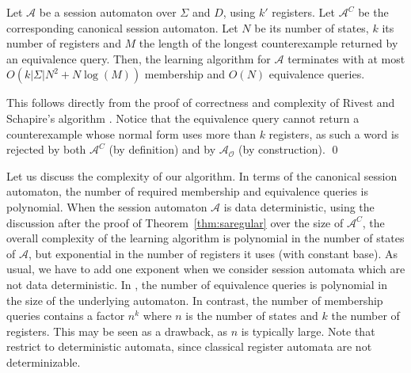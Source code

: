 \documentclass{LMCS}
\def\A{\mathcal A}
\newcommand{\can}[1]{#1^{C}}
\begin{document}
\begin{thm}
  Let $\A$ be a session automaton over $\Sigma$ and $D$, using $k'$
  registers. Let $\can{\A}$ be the corresponding canonical session
  automaton. Let $N$ be its number of states, $k$ its number of
  registers and $M$ the length of the longest counterexample returned
  by an equivalence query. Then, the learning algorithm for $\A$
  terminates with at most $O(k |\Sigma| N^2 + N \log (M))$ membership
  and $O(N)$ equivalence queries.
\end{thm}
\proof
  This follows directly from the proof of correctness and complexity
  of Rivest and Schapire's algorithm \cite{BergR05,RiSh:inference}.
  Notice that the equivalence query cannot return a counterexample
  whose normal form uses more than $k$ registers, as such a word is
  rejected by both $\can{\A}$ (by definition) and by $\A_{\mathcal O}$
  (by construction). \qed

Let us discuss the complexity of our algorithm. In terms of the
canonical session automaton, the number of required membership and
equivalence queries is polynomial. When the session automaton $\A$ is
data deterministic, using the discussion after the proof of
Theorem~\ref{thm:saregular} over the size of $\can\A$, the overall
complexity of the learning algorithm is polynomial in the number of
states of $\A$, but exponential in the number of registers it uses
(with constant base). As usual, we have to add one exponent when we
consider session automata which are not data deterministic. In
\cite{HowarSJC12}, the number of equivalence queries is polynomial in
the size of the underlying automaton. In contrast, the number of
membership queries contains a factor $n^k$ where $n$ is the number of
states and $k$ the number of registers.  This may be seen as a
drawback, as $n$ is typically large.  Note that \cite{HowarSJC12}
restrict to deterministic automata, since classical register automata
are not determinizable.
\end{document}
